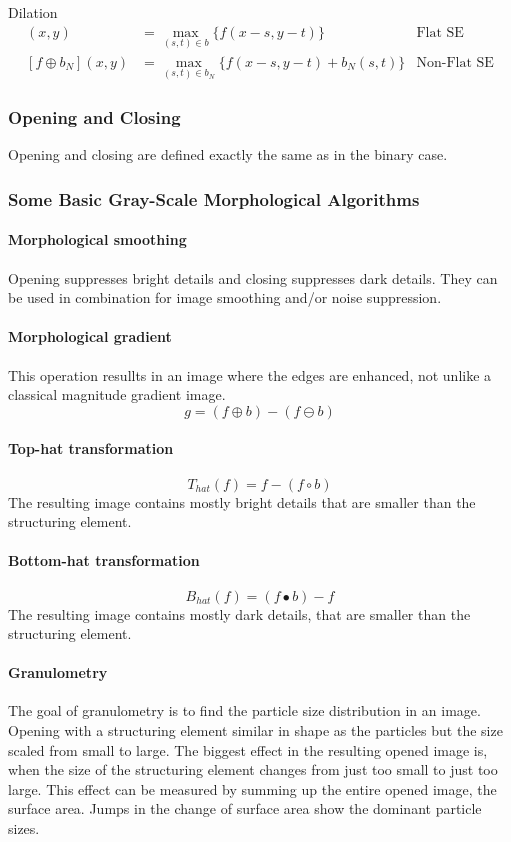 Dilation
\begin{align*}
	[f\oplus b](x,y)	&= \max_{(s,t)\in b} \{f(x-s,y-t)\}				& \text{Flat SE} \\
	[f\oplus b_N](x,y)	&= \max_{(s,t)\in b_N} \{f(x-s,y-t) +b_N(s,t)\}	& \text{Non-Flat SE} 
\end{align*}

\subsubsection{Opening and Closing}
Opening and closing are defined exactly the same as in the binary case.

\subsubsection{Some Basic Gray-Scale Morphological Algorithms}
\paragraph{Morphological smoothing}
Opening suppresses bright details and closing suppresses dark details. They can be used in combination for image smoothing and/or noise suppression.
\paragraph{Morphological gradient}
This operation resullts in an image where the edges are enhanced, not unlike a classical magnitude gradient image.
\[
	g=(f\oplus b)-(f\ominus b)
\]
\paragraph{Top-hat transformation}
\[
	T_{hat}(f) = f -(f \circ b)
\]
The resulting image contains mostly bright details that are smaller than the structuring element.
\paragraph{Bottom-hat transformation}
\[
	B_{hat}(f) = (f \bullet b)-f
\]
The resulting image contains mostly dark details, that are smaller than the structuring element.
\paragraph{Granulometry}
The goal of granulometry is to find the particle size distribution in an image. Opening with a structuring element similar in shape as the particles but the size scaled from small to large. The biggest effect in the resulting opened image is, when the size of the structuring element changes from just too small to just too large. This effect can be measured by summing up the entire opened image, the surface area. Jumps in the change of surface area show the dominant particle sizes.
